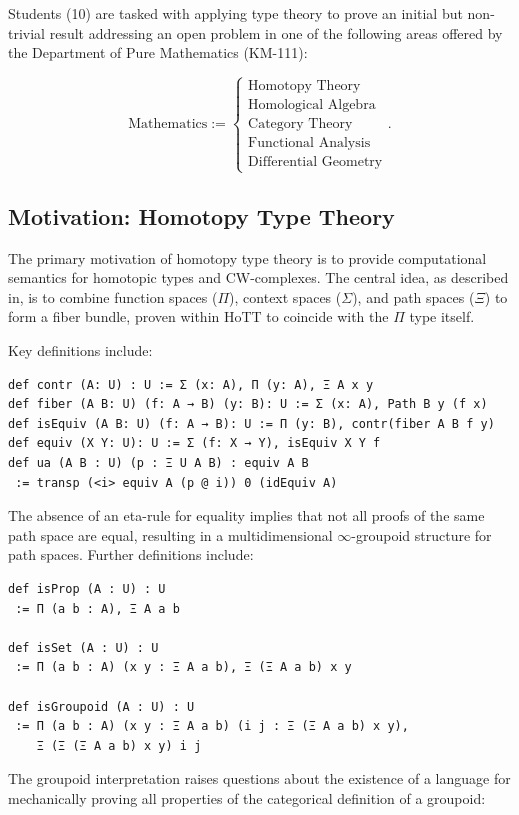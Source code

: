 \documentclass{article}
\theoremstyle{definition}
\begin{document}
Students (10) are tasked with applying type theory to prove an initial
but non-trivial result addressing an open problem in one of the following
areas offered by the Department of Pure Mathematics (KM-111):

\[
\text{Mathematics} :=
\begin{cases}
\text{Homotopy Theory} \\
\text{Homological Algebra} \\
\text{Category Theory} \\
\text{Functional Analysis} \\
\text{Differential Geometry}
\end{cases} .
\]


\newpage
\subsection{Motivation: Homotopy Type Theory}
The primary motivation of homotopy type theory is to provide computational
semantics for homotopic types and CW-complexes. The central idea, as
described in, is to combine function spaces (\(\Pi\)),
context spaces (\(\Sigma\)), and path spaces (\(\Xi\)) to form a fiber bundle, proven within HoTT to coincide with the $\Pi$ type itself.

Key definitions include:

\begin{lstlisting}
def contr (A: U) : U := Σ (x: A), Π (y: A), Ξ A x y
def fiber (A B: U) (f: A → B) (y: B): U := Σ (x: A), Path B y (f x)
def isEquiv (A B: U) (f: A → B): U := Π (y: B), contr(fiber A B f y)
def equiv (X Y: U): U := Σ (f: X → Y), isEquiv X Y f
def ua (A B : U) (p : Ξ U A B) : equiv A B
 := transp (<i> equiv A (p @ i)) 0 (idEquiv A)
\end{lstlisting}

The absence of an eta-rule for equality implies that not all proofs of the
same path space are equal, resulting in a multidimensional \(\infty\)-groupoid
structure for path spaces. Further definitions include:

\begin{lstlisting}
def isProp (A : U) : U
 := Π (a b : A), Ξ A a b

def isSet (A : U) : U
 := Π (a b : A) (x y : Ξ A a b), Ξ (Ξ A a b) x y

def isGroupoid (A : U) : U
 := Π (a b : A) (x y : Ξ A a b) (i j : Ξ (Ξ A a b) x y),
    Ξ (Ξ (Ξ A a b) x y) i j
\end{lstlisting}

The groupoid interpretation raises questions about the existence of a language for
mechanically proving all properties of the categorical definition of a groupoid:
\end{document}
